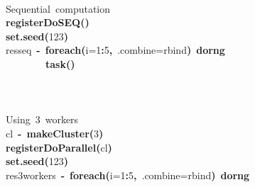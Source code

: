 \documentclass[a4paper,12pt]{article}\usepackage{graphicx, color}
\makeatletter
\newcommand{\hlnumber}[1]{\textcolor[rgb]{0,0,0}{#1}}%
\newcommand{\hlfunctioncall}[1]{\textcolor[rgb]{0.501960784313725,0,0.329411764705882}{\textbf{#1}}}%
\newcommand{\hlkeyword}[1]{\textcolor[rgb]{0,0,0}{\textbf{#1}}}%
\newcommand{\hlargument}[1]{\textcolor[rgb]{0.690196078431373,0.250980392156863,0.0196078431372549}{#1}}%
\newcommand{\hlcomment}[1]{\textcolor[rgb]{0.180392156862745,0.6,0.341176470588235}{#1}}%
\newcommand{\hlassignement}[1]{\textcolor[rgb]{0,0,0}{\textbf{#1}}}%
\newcommand{\hlsymbol}[1]{\textcolor[rgb]{0,0,0}{#1}}%
\newcommand{\hlstd}[1]{\textcolor[rgb]{0,0,0}{#1}}%
\newenvironment{kframe}{%
 \def\FrameCommand##1{\hskip\@totalleftmargin \hskip-\fboxsep
 \colorbox{shadecolor}{##1}\hskip-\fboxsep
     \hskip-\linewidth \hskip-\@totalleftmargin \hskip\columnwidth}%
 \MakeFramed {\advance\hsize-\width
   \@totalleftmargin\z@ \linewidth\hsize
   \@setminipage}}%
 {\par\unskip\endMakeFramed}
\newenvironment{knitrout}{}{} %
\renewenvironment{knitrout}{\begin{footnotesize}}{\end{footnotesize}}
\makeatother
\begin{document}
\begin{knitrout}
\begin{kframe}
\begin{flushleft}
\hlstd{}\hspace*{\fill}\\
\hlstd{}\hlcomment{\usebox{\hlnormalsizeboxhash}{\ }Sequential{\ }computation}\hspace*{\fill}\\
\hlstd{}\hlfunctioncall{registerDoSEQ}\hlkeyword{(}\hlkeyword{)}\hspace*{\fill}\\
\hlstd{}\hlfunctioncall{set.seed}\hlkeyword{(}\hlnumber{123}\hlkeyword{)}\hspace*{\fill}\\
\hlstd{}\hlsymbol{res\usebox{\hlnormalsizeboxunderscore}seq}{\ }\hlassignement{\usebox{\hlnormalsizeboxlessthan}-}{\ }\hlfunctioncall{foreach}\hlkeyword{(}\hlargument{i}\hlargument{=}\hlnumber{1}\hlkeyword{:}\hlnumber{5}\hlkeyword{,}{\ }\hlargument{.combine}\hlargument{=}\hlsymbol{rbind}\hlkeyword{)}{\ }\hlkeyword{\usebox{\hlnormalsizeboxpercent}dorng\usebox{\hlnormalsizeboxpercent}}{\ }\hlkeyword{\usebox{\hlnormalsizeboxopenbrace}}\hspace*{\fill}\\
\hlstd{}{\ }{\ }{\ }{\ }{\ }{\ }{\ }{\ }\hlfunctioncall{task}\hlkeyword{(}\hlkeyword{)}\hspace*{\fill}\\
\hlstd{}\hlkeyword{\usebox{\hlnormalsizeboxclosebrace}}\hspace*{\fill}\\
\hlstd{}\hlcomment{\usebox{\hlnormalsizeboxhash}}\hspace*{\fill}\\
\hlstd{}\hspace*{\fill}\\
\hlstd{}\hlcomment{\usebox{\hlnormalsizeboxhash}{\ }Using{\ }3{\ }workers}\hspace*{\fill}\\
\hlstd{}\hlsymbol{cl}{\ }\hlassignement{\usebox{\hlnormalsizeboxlessthan}-}{\ }\hlfunctioncall{makeCluster}\hlkeyword{(}\hlnumber{3}\hlkeyword{)}\hspace*{\fill}\\
\hlstd{}\hlfunctioncall{registerDoParallel}\hlkeyword{(}\hlsymbol{cl}\hlkeyword{)}\hspace*{\fill}\\
\hlstd{}\hlfunctioncall{set.seed}\hlkeyword{(}\hlnumber{123}\hlkeyword{)}\hspace*{\fill}\\
\hlstd{}\hlsymbol{res\usebox{\hlnormalsizeboxunderscore}3workers}{\ }\hlassignement{\usebox{\hlnormalsizeboxlessthan}-}{\ }\hlfunctioncall{foreach}\hlkeyword{(}\hlargument{i}\hlargument{=}\hlnumber{1}\hlkeyword{:}\hlnumber{5}\hlkeyword{,}{\ }\hlargument{.combine}\hlargument{=}\hlsymbol{rbind}\hlkeyword{)}{\ }\hlkeyword{\usebox{\hlnormalsizeboxpercent}dorng\usebox{\hlnormalsizeboxpercent}}{\ }\hlkeyword{\usebox{\hlnormalsizeboxopenbrace}}\hspace*{\fill}\\

\end{flushleft}
\end{kframe}
\end{knitrout}
\end{document}
